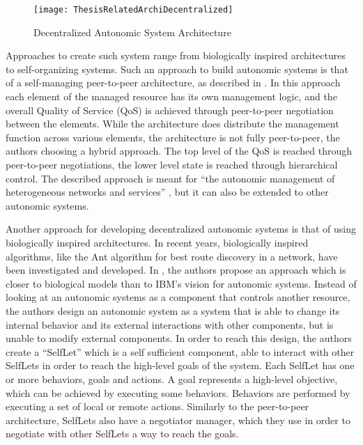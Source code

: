 \begin{figure}
	\centering
		\texttt{[image: ThesisRelatedArchiDecentralized]}
	\caption{Decentralized Autonomic System Architecture}
	\label{fig:decentrarchi}
\end{figure}

Approaches to create such system range from biologically inspired architectures to self-organizing systems. Such an approach to build autonomic systems is that of a self-managing peer-to-peer architecture, as described in \cite{related:architecture:selfmanagep2p}. In this approach each element of the managed resource has its own management logic, and the overall Quality of Service (QoS) is achieved through peer-to-peer negotiation between the elements. While the architecture does distribute the management function across various elements, the architecture is not fully peer-to-peer, the authors choosing a hybrid approach. The top level of the QoS is reached through peer-to-peer negotiations, the lower level state is reached through hierarchical control. The described approach is meant for ``the autonomic management of heterogeneous networks and services'' \cite{related:architecture:selfmanagep2p}, but it can also be extended to other autonomic systems.

Another approach for developing decentralized autonomic systems is that of using biologically inspired architectures. In recent years, biologically inspired algorithms, like the Ant algorithm \cite{antalgorithm} for best route discovery in a network, have been investigated and developed. In \cite{related:architecture:selflet}, the authors propose an approach which is closer to biological models than to IBM's vision for autonomic systems. Instead of looking at an autonomic systems as a component that controls another resource, the authors design an autonomic system as a system that is able to change its internal behavior and its external interactions with other components, but is unable to modify external components. In order to reach this design, the authors create a ``SelfLet'' which is a self sufficient component, able to interact with other SelfLets in order to reach the high-level goals of the system. Each SelfLet has one or more behaviors, goals and actions. A goal represents a high-level objective, which can be achieved by executing some behaviors. Behaviors are performed by executing a set of local or remote actions. Similarly to the peer-to-peer architecture, SelfLets also have a negotiator manager, which they use in order to negotiate with other SelfLets a way to reach the goals.

